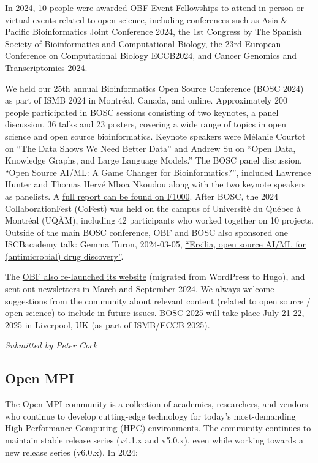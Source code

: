 \documentclass[a4paper]{report}
\begin{document}
In 2024, 10 people were awarded OBF Event Fellowships to attend in-person or virtual events related to open science, including conferences such as Asia \& Pacific Bioinformatics Joint Conference 2024, the 1st Congress by The Spanish Society of Bioinformatics and Computational Biology, the 23rd European Conference on Computational Biology ECCB2024, and Cancer Genomics and Transcriptomics 2024.

We held our 25th annual Bioinformatics Open Source Conference (BOSC 2024) as part of ISMB 2024 in Montréal, Canada, and online. Approximately 200 people participated in BOSC sessions consisting of two keynotes, a panel discussion, 36 talks and 23 posters, covering a wide range of topics in open science and open source bioinformatics. Keynote speakers were Mélanie Courtot on ``The Data Shows We Need Better Data'' and Andrew Su on ``Open Data, Knowledge Graphs, and Large Language Models.'' The BOSC panel discussion, ``Open Source AI/ML: A Game Changer for Bioinformatics?'', included Lawrence Hunter and Thomas Hervé Mboa Nkoudou along with the two keynote speakers as panelists. A \href{https://f1000research.com/articles/13-1100}{full report can be found on F1000}. After BOSC, the 2024 CollaborationFest (CoFest) was held on the campus of Université du Québec à Montréal (UQÀM), including 42 participants who worked together on 10 projects. Outside of the main BOSC conference, OBF and BOSC also sponsored one ISCBacademy talk: Gemma Turon, 2024-03-05, \href{https://www.open-bio.org/2024/03/26/gemma-turon-iscbacademy-talk-video/}{“Ersilia, open source AI/ML for (antimicrobial) drug discovery”}.

The \href{https://www.open-bio.org/}{OBF also re-launched its website} (migrated from WordPress to Hugo), and \href{https://github.com/OBF/newsletter/tree/master/newsletters}{sent out newsletters in March and September 2024}. We always welcome suggestions from the community about relevant content (related to open source / open science) to include in future issues.
\href{https://www.open-bio.org/events/bosc-2025/}{BOSC 2025} will take place July 21-22, 2025 in Liverpool, UK (as part of \href{https://www.iscb.org/ismbeccb2025/home}{ISMB/ECCB 2025}).

{\em Submitted by Peter Cock}

\subsection{Open MPI}

The Open MPI community is a collection of academics, researchers, and vendors who continue to develop cutting-edge technology for today’s most-demanding High Performance Computing (HPC) environments.  The community continues to maintain stable release series (v4.1.x and v5.0.x), even while working towards a new release series (v6.0.x).
In 2024:
\end{document}

